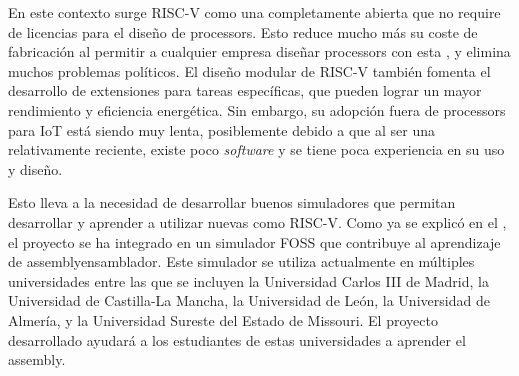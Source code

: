 En este contexto surge RISC-V como una  completamente
abierta que no require de licencias para el diseño de \glspl{processor}. Esto
reduce mucho más su coste de fabricación al permitir a cualquier empresa diseñar
\glspl{processor} con esta , y elimina muchos
problemas políticos. El diseño modular de RISC-V también fomenta el desarrollo
de extensiones para tareas específicas, que pueden lograr un mayor rendimiento y
eficiencia energética. Sin embargo, su adopción fuera de \glspl{processor} para
\gls{IoT} está siendo muy lenta, posiblemente debido a que al ser una
 relativamente reciente, existe poco
\textit{software} y se tiene poca experiencia en su uso y diseño.

Esto lleva a la necesidad de desarrollar buenos simuladores que permitan
desarrollar y aprender a utilizar nuevas  como
RISC-V. Como ya se explicó en el , el proyecto se ha
integrado en un simulador \gls{FOSS} que contribuye al aprendizaje de
\gls{assembly}{ensamblador}. Este simulador se utiliza actualmente en múltiples
universidades entre las que se incluyen la Universidad Carlos III de Madrid, la
Universidad de Castilla-La Mancha, la Universidad de León, la Universidad de
Almería, y la Universidad Sureste del Estado de Missouri. El proyecto
desarrollado ayudará a los estudiantes de estas universidades a aprender el
\gls{assembly}.

